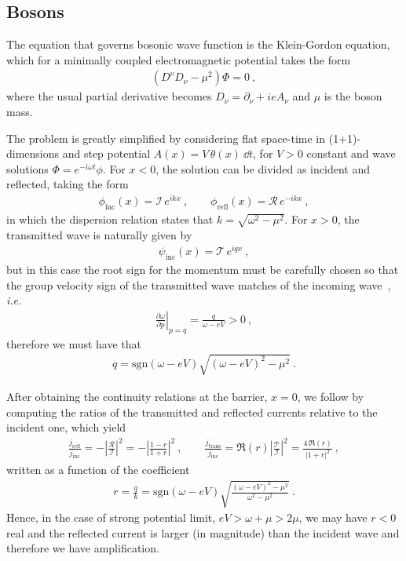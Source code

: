 \subsection{Bosons}

The equation that governs bosonic wave function is the Klein-Gordon equation, which for a minimally coupled electromagnetic potential takes the form
\begin{align}
    (D^\nu D_\nu - \mu^2) \Phi = 0 ~,
    \label{eq1:KleinGordon}
\end{align}
where the usual partial derivative becomes $D_\nu = \partial_\nu + i e A_\nu$ and $\mu$ is the boson mass.

The problem is greatly simplified by considering flat space-time in (1+1)-dimensions and step potential $A(x) = V\,\theta(x) ~\dd t$, for $V>0$ constant and wave solutions $\Phi= e^{-i \omega t} \phi$.
For $x<0$, the solution can be divided as incident and reflected, taking the form
\begin{align}
    \phi_\mathrm{inc}(x) = \mathcal{I}\, e^{i k x}  ~, \qquad
    \phi_\mathrm{refl}(x) = \mathcal{R}\, e^{- i k x} ~,
    \label{eq1:KGsolneg}
\end{align}
in which the dispersion relation states that $k=\sqrt{\omega^2-\mu^2}$. For $x>0$, the transmitted wave is naturally given by 
\begin{align}
    \psi_\mathrm{inc}(x) = \mathcal{T}\, e^{i q x}  ~,
    \label{eq1:KGsolpos}
\end{align}
but in this case the root sign for the momentum must be carefully chosen so that the group velocity sign of the transmitted wave matches of the incoming wave~\cite{Manogue1988}, \textit{i.e.}
\begin{align}
    \left.\frac{\partial \omega}{\partial p}\right|_{p=q} = \frac{q}{\omega - e V} > 0 ~,
    \label{eq1:KGphasev}
\end{align}
therefore we must have that
\begin{align}
    q = \mathrm{sgn}(\omega - e V) \sqrt{ (\omega - e V)^2 - \mu^2 } ~.
    \label{eq1:KGq}
\end{align}

After obtaining the continuity relations at the barrier, $x=0$, we follow by computing the ratios of the transmitted and reflected currents relative to the incident one, which yield
\begin{align}
    \frac{j_\mathrm{refl}}{j_\mathrm{inc}} = - \left|\frac{\mathcal{R}}{\mathcal{I}}\right|^2 = -\left|\frac{1-r}{1+r}\right|^2  ~, \qquad \frac{j_\mathrm{trans}}{j_\mathrm{inc}} = \Re(r) \left|\frac{\mathcal{T}}{\mathcal{I}}\right|^2 = \frac{4\, \Re(r)}{|1+r|^2} ~,
    \label{eq1:KGcurrents}
\end{align}
written as a function of the coefficient 
\begin{align}
    r = \frac{q}{k} = \mathrm{sgn}(\omega - e V)  \sqrt{\frac{(\omega - e V)^2 - \mu^2}{\omega^2 - \mu^2}} ~.
    \label{eq1:KGr}
\end{align}
Hence, in the case of strong potential limit, $e V > \omega + \mu > 2 \mu$, we may have $r<0$ real and the reflected current is larger (in magnitude) than the incident wave and therefore we have amplification.

